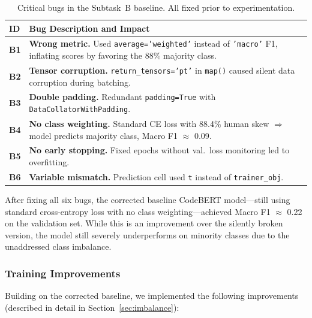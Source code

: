 \documentclass[11pt]{article}
\begin{document}
\begin{table}[htbp]
\centering
\footnotesize
\begin{tabularx}{\columnwidth}{@{}l X@{}}
\toprule
\textbf{ID} & \textbf{Bug Description and Impact} \\ \midrule
\textbf{B1} & \textbf{Wrong metric.} Used \texttt{average='weighted'} instead of \texttt{'macro'} F1, inflating scores by favoring the 88\% majority class. \\
\textbf{B2} & \textbf{Tensor corruption.} \texttt{return\_tensors='pt'} in \texttt{map()} caused silent data corruption during batching. \\
\textbf{B3} & \textbf{Double padding.} Redundant \texttt{padding=True} with \texttt{DataCollatorWithPadding}. \\
\textbf{B4} & \textbf{No class weighting.} Standard CE loss with 88.4\% human skew $\Rightarrow$ model predicts majority class, Macro F1 $\approx$ 0.09. \\
\textbf{B5} & \textbf{No early stopping.} Fixed epochs without val.\ loss monitoring led to overfitting. \\
\textbf{B6} & \textbf{Variable mismatch.} Prediction cell used \texttt{t} instead of \texttt{trainer\_obj}. \\
\bottomrule
\end{tabularx}
\caption{Critical bugs in the Subtask~B baseline. All fixed prior to experimentation.}
\label{tab:taskB_bugs}
\end{table}

After fixing all six bugs, the corrected baseline CodeBERT model---still using standard cross-entropy loss with no class weighting---achieved Macro F1 $\approx$ 0.22 on the validation set. While this is an improvement over the silently broken version, the model still severely underperforms on minority classes due to the unaddressed class imbalance.

\subsubsection{Training Improvements}
\label{sec:taskB_improvements}

Building on the corrected baseline, we implemented the following improvements (described in detail in Section~\ref{sec:imbalance}):
\end{document}
